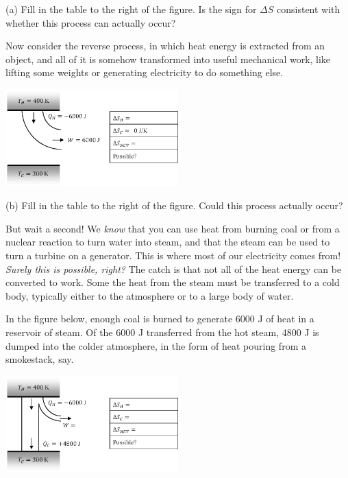 (a) Fill in the table to the right of the figure.  Is the sign for $\Delta S$ consistent with whether this process can actually occur?
\answerspace{0.6 in}

\pagebreak[3]
Now consider the reverse process, in which heat energy is extracted from an object, and all of it is somehow transformed into useful mechanical work, like lifting some weights or generating electricity to do something else.

\begin{center}
\vspace{-0.3 in}
\includegraphics[width=0.5\textwidth]{entropy_is_it_possible/fig4.eps}
\vspace{-0.3 in}
\end{center}

(b) Fill in the table to the right of the figure.  Could this process actually occur? 
\answerspace{0.2 in}

But wait a second!  We \textit{know} that you can use heat from burning coal or from a nuclear reaction to turn water into steam, and that the steam can be used to turn a turbine on a generator.  This is where most of our electricity comes from!  \textit{Surely this is possible, right?}  The catch is that not all of the heat energy can be converted to work.  Some the heat from the steam must be transferred to a cold body, typically either to the atmosphere or to a large body of water.  

In the figure below, enough coal is burned to generate 6000 J of heat in a reservoir of steam.  Of the 6000 J transferred from the hot steam, 4800 J is dumped into the colder atmosphere, in the form of heat pouring from a smokestack, say.   

\begin{center}
\vspace{-0.3 in}
\includegraphics[width=0.5\textwidth]{entropy_is_it_possible/fig5.eps}
\vspace{-0.3 in}
\end{center}

